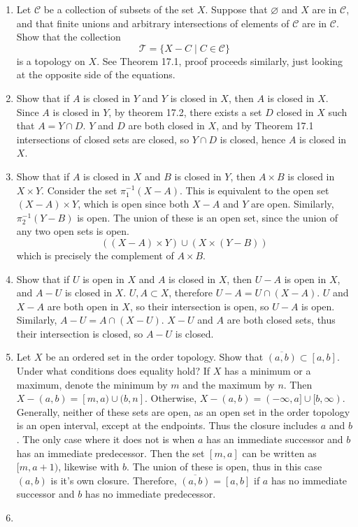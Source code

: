 \documentclass[12pt,letterpaper]{article}
\newcommand{\n}{\break}
\let\emptyset\varnothing
\newcommand{\T}{\ensuremath{\mathcal{T}}}
\begin{document}
\RaggedRight
\begin{enumerate}
  \item Let $\mathcal{C}$ be a collection of subsets of the set $X$. Suppose that $\emptyset$ and $X$ are in $\mathcal{C}$, and that finite unions and arbitrary intersections of elements of $\mathcal{C}$ are in $\mathcal{C}$. Show that the collection $$\T = \{X-C\; |\; C\in\mathcal{C}\}$$ is a topology on $X$.\n
  \indent See Theorem 17.1, proof proceeds similarly, just looking at the opposite side of the equations.
  \item Show that if $A$ is closed in $Y$ and $Y$ is closed in $X$, then $A$ is closed in $X$.\n
  \indent Since $A$ is closed in $Y$, by theorem 17.2, there exists a set $D$ closed in $X$ such that $A=Y\cap D$.
  $Y$ and $D$ are both closed in $X$, and by Theorem 17.1 intersections of closed sets are closed, so $Y\cap D$ is closed, hence $A$ is closed in $X$.
  \item Show that if $A$ is closed in $X$ and $B$ is closed in $Y$, then $A\times B$ is closed in $X\times Y$.\n
  \indent Consider the set $\pi_1^{-1}(X-A)$. This is equivalent to the open set $(X-A)\times Y$, which is open since both $X-A$ and $Y$ are open. Similarly, $\pi_2^{-1}(Y-B)$ is open. The union of these is an open set, since the union of any two open sets is open.
  $$((X-A)\times Y)\cup (X\times (Y-B))$$
  which is precisely the complement of $A\times B$.
  \item Show that if $U$ is open in $X$ and $A$ is closed in $X$, then $U-A$ is open in $X$, and $A-U$ is closed in $X$.\n
  \indent $U,A\subset X$, therefore $U-A = U\cap(X-A)$. $U$ and $X-A$ are both open in $X$, so their intersection is open, so $U-A$ is open.\hspace{5in}\n
  Similarly, $A-U=A\cap (X-U)$. $X-U$ and $A$ are both closed sets, thus their intersection is closed, so $A-U$ is closed. \hspace{5in}
  \item Let $X$ be an ordered set in the order topology. Show that $\overline{(a,b)} \subset [a,b]$. Under what conditions does equality hold? \n
  \indent If $X$ has a minimum or a maximum, denote the minimum by $m$ and the maximum by $n$. Then $X-(a,b) = [m,a) \cup (b, n]$. Otherwise, $X-(a,b)=(-\infty,a]\cup[b,\infty)$. Generally, neither of these sets are open, as an open set in the order topology is an open interval, except at the endpoints. Thus the closure includes $a$ and $b$. The only case where it does not is when $a$ has an immediate successor and $b$ has an immediate predecessor. Then the set $[m,a]$ can be written as $[m,a+1)$, likewise with $b$. The union of these is open, thus in this case $(a,b)$ is it's own closure. Therefore, $\overline{(a,b)}=[a,b]$ if $a$ has no immediate successor and $b$ has no immediate predecessor.\n
  \item
\end{enumerate}
\end{document}
